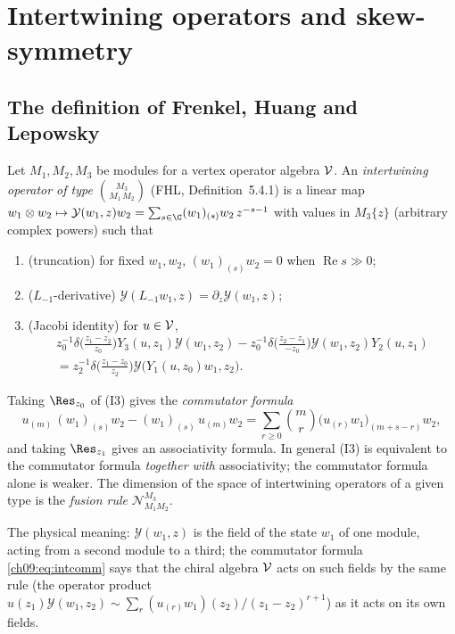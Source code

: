 \section{Intertwining operators and skew-symmetry}\label{ch09:sec:intertwiners}

\subsection{The definition of Frenkel, Huang and Lepowsky}

Let $M_1,M_2,M_3$ be modules for a vertex operator algebra $\mathcal{V}$. An \emph{intertwining
operator of type $\binom{M_3}{M_1\,M_2}$} (FHL, Definition~5.4.1) is a linear map
$w_1\otimes w_2\mapsto\mathcal Y(w_1,z)w_2=\sum_{s\in\C}(w_1)_{(s)}w_2\,z^{-s-1}$ with values in
$M_3\{z\}$ (arbitrary complex powers) such that
\begin{enumerate}
\item[(I1)] (truncation) for fixed $w_1,w_2$, $(w_1)_{(s)}w_2=0$ when $\operatorname{Re}s\gg0$;
\item[(I2)] ($L_{-1}$-derivative) $\mathcal Y(L_{-1}w_1,z)=\partial_z\mathcal Y(w_1,z)$;
\item[(I3)] (Jacobi identity) for $u\in\mathcal{V}$,
\begin{multline*}
z_0^{-1}\delta\!\Big(\frac{z_1-z_2}{z_0}\Big)Y_3(u,z_1)\mathcal Y(w_1,z_2)
-z_0^{-1}\delta\!\Big(\frac{z_2-z_1}{-z_0}\Big)\mathcal Y(w_1,z_2)Y_2(u,z_1)\\
=z_2^{-1}\delta\!\Big(\frac{z_1-z_0}{z_2}\Big)\mathcal Y\big(Y_1(u,z_0)w_1,z_2\big).
\end{multline*}
\end{enumerate}
Taking $\Res_{z_0}$ of (I3) gives the \emph{commutator formula}
\begin{equation}\label{ch09:eq:intcomm}
u_{(m)}\,(w_1)_{(s)}w_2-(w_1)_{(s)}\,u_{(m)}w_2=\sum_{r\ge0}\binom{m}{r}\big(u_{(r)}w_1\big)_{(m+s-r)}w_2 ,
\end{equation}
and taking $\Res_{z_1}$ gives an associativity formula. In general (I3) is equivalent to the
commutator formula \emph{together with} associativity; the commutator formula alone is weaker.
The dimension of the space of intertwining operators of a given type is the \emph{fusion rule}
$\mathcal N^{M_3}_{M_1M_2}$.

The physical meaning: $\mathcal Y(w_1,z)$ is the field of the state $w_1$ of one module, acting
from a second module to a third; the commutator formula \eqref{ch09:eq:intcomm} says that the
chiral algebra $\mathcal{V}$ acts on such fields by the same rule (the operator product
$u(z_1)\mathcal Y(w_1,z_2)\sim\sum_r (u_{(r)}w_1)(z_2)/(z_1-z_2)^{r+1}$) as it acts on its own
fields.

